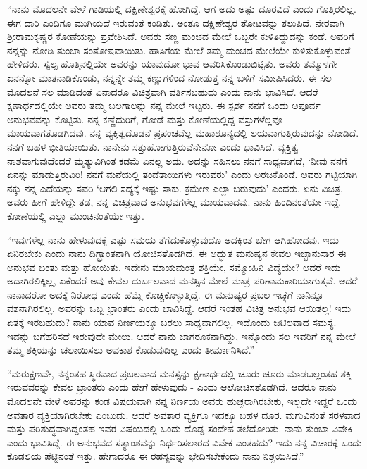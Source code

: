 “ನಾನು ಮೊದಲನೇ ವೇಳೆ ಗಾಡಿಯಲ್ಲಿ ದಕ್ಷಿಣೇಶ್ವರಕ್ಕೆ ಹೋಗಿದ್ದೆ. ಆಗ ಅದು ಅಷ್ಟು ದೂರವಿದೆ ಎಂದು ಗೊತ್ತಿರಲಿಲ್ಲ. ಈಗ ದಾರಿ ಎಂದಿಗೂ ಮುಗಿಯದೆ ಇರುವಂತೆ ಕಂಡಿತು. ಅಂತೂ ದಕ್ಷಿಣೇಶ್ವರ ತೋಟವನ್ನು ತಲುಪಿದೆ. ನೇರವಾಗಿ ಶ‍್ರೀರಾಮಕೃಷ್ಣರ ಕೋಣೆಯನ್ನು ಪ್ರವೇಶಿಸಿದೆ. ಅವರು ಸಣ್ಣ ಮಂಚದ ಮೇಲೆ ಒಬ್ಬರೇ ಕುಳಿತಿದ್ದುದನ್ನು ಕಂಡೆ. ಅವರಿಗೆ ನನ್ನನ್ನು ನೋಡಿ ತುಂಬಾ ಸಂತೋಷವಾಯಿತು. ಹಾಸಿಗೆಯ ಮೇಲೆ ತಮ್ಮ ಮಂಚದ ಮೇಲೆಯೇ ಕುಳಿತುಕೊಳ್ಳುವಂತೆ ಹೇಳಿದರು. ಸ್ವಲ್ಪ ಹೊತ್ತಿನಲ್ಲಿಯೇ ಅವರನ್ನು ಯಾವುದೋ ಭಾವ ಆವರಿಸಿಕೊಂಡುಬಿಟ್ಟಿತು. ಅವರು ತಮ್ಮೊಳಗೇ ಏನನ್ನೋ ಮಾತನಾಡಿಕೊಂಡು, ನನ್ನನ್ನೇ ತಮ್ಮ ಕಣ್ಣುಗಳಿಂದ ನೋಡುತ್ತ ನನ್ನ ಬಳಿಗೆ ಸಮೀಪಿಸಿದರು. ಈ ಸಲ ಮೊದಲನೆ ಸಲ ಮಾಡಿದಂತೆ ಏನಾದರೂ ವಿಚಿತ್ರವಾಗಿ ವರ್ತಿಸಬಹುದು ಎಂದು ನಾನು ಭಾವಿಸಿದೆ. ಆದರೆ ಕ್ಷಣಾರ್ಧದಲ್ಲಿಯೇ ಅವರು ತಮ್ಮ ಬಲಗಾಲನ್ನು ನನ್ನ ಮೇಲೆ ಇಟ್ಟರು. ಈ ಸ್ಪರ್ಶ ನನಗೆ ಒಂದು ಅಪೂರ್ವ ಅನುಭವವನ್ನು ಕೊಟ್ಟಿತು. ನನ್ನ ಕಣ್ಣೆದುರಿಗೆ, ಗೋಡೆ ಮತ್ತು ಕೋಣೆಯಲ್ಲಿದ್ದ ವಸ್ತುಗಳೆಲ್ಲವೂ ಮಾಯವಾಗತೊಡಗಿದವು. ನನ್ನ ವ್ಯಕ್ತಿತ್ವದೊಡನೆ ಪ್ರಪಂಚವೆಲ್ಲ ಮಹಾಶೂನ್ಯದಲ್ಲಿ ಲಯವಾಗುತ್ತಿರುವುದನ್ನು ನೋಡಿದೆ. ನನಗೆ ಬಹಳ ಭೀತಿಯಾಯಿತು. ನಾನೇನು ಸತ್ತುಹೋಗುತ್ತಿರುವೆನೇನೋ ಎಂದು ಭಾವಿಸಿದೆ. ವ್ಯಕ್ತಿತ್ವ ನಾಶವಾಗುವುದೆಂದರೆ ಮೃತ್ಯುವಿಗಿಂತ ಕಡಮೆ ಏನಲ್ಲ ಅದು. ಅದನ್ನು ಸಹಿಸಲು ನನಗೆ ಸಾಧ್ಯವಾಗದೆ, ‘ನೀವು ನನಗೆ ಏನನ್ನು ಮಾಡುತ್ತಿರುವಿರಿ! ನನಗೆ ಮನೆಯಲ್ಲಿ ತಂದೆತಾಯಿಗಳು ಇರುವರು’ ಎಂದು ಅರಚಿಕೊಂಡೆ. ಅವರು ಗಟ್ಟಿಯಾಗಿ ನಕ್ಕು ನನ್ನ ಎದೆಯನ್ನು ಸವರಿ ‘ಆಗಲಿ ಸದ್ಯಕ್ಕೆ ಇಷ್ಟು ಸಾಕು. ಕ್ರಮೇಣ ಎಲ್ಲಾ ಬರುವುದು’ ಎಂದರು. ಏನು ವಿಚಿತ್ರ, ಅವರು ಹೀಗೆ ಹೇಳಿದ್ದೇ ತಡ, ನನ್ನ ವಿಚಿತ್ರವಾದ ಅನುಭವಗಳೆಲ್ಲ ಮಾಯವಾದವು. ನಾನು ಹಿಂದಿನಂತೆಯೇ ಇದ್ದೆ. ಕೋಣೆಯಲ್ಲಿ ಎಲ್ಲಾ ಮುಂಚಿನಂತೆಯೇ ಇತ್ತು.

“ಇವುಗಳೆಲ್ಲ ನಾನು ಹೇಳುವುದಕ್ಕೆ ಎಷ್ಟು ಸಮಯ ತೆಗೆದುಕೊಳ್ಳುವುದೊ ಅದಕ್ಕಿಂತ ಬೇಗ ಆಗಿಹೋದವು. ಇದು ಏನಿರಬೇಕು ಎಂದು ನಾನು ದಿಗ್ಭ್ರಾಂತನಾಗಿ ಯೋಚಿಸತೊಡಗಿದೆ. ಈ ಅದ್ಭುತ ಮನುಷ್ಯನ ಕೇವಲ ಇಚ್ಛಾನುಸಾರ ಈ ಅನುಭವ ಬಂತು ಮತ್ತು ಹೋಯಿತು. ಇದೇನು ಮಾಯಮಂತ್ರ ಶಕ್ತಿಯೇ, ಸಮ್ಮೋಹಿನಿ ವಿದ್ಯೆಯೇ? ಆದರೆ ಇದು ಅದಾಗಿರಲಿಕ್ಕಿಲ್ಲ, ಏಕೆಂದರೆ ಅವು ಕೇವಲ ದುರ್ಬಲವಾದ ಮನಸ್ಸಿನ ಮೇಲೆ ಮಾತ್ರ ಪರಿಣಾಮಕಾರಿಯಾಗುತ್ತವೆ. ಆದರೆ ನಾನಾದರೋ ಅದಕ್ಕೆ ನಿರೋಧ ಎಂದು ಹೆಮ್ಮೆ ಕೊಚ್ಚಿಕೊಳ್ಳುತ್ತಿದ್ದೆ. ಈ ಮನುಷ್ಯರ ಪ್ರಬಲ ಇಚ್ಛೆಗೆ ನಾನಿನ್ನೂ ವಶನಾಗಿರಲಿಲ್ಲ. ಅವರನ್ನು ಒಬ್ಬ ಭ್ರಾಂತರು ಎಂದು ಭಾವಿಸಿದ್ದೆ. ಆದರೆ ಇಂತಹ ವಿಚಿತ್ರ ಅನುಭವ ಆಯಿತಲ್ಲ! ಇದು ಏತಕ್ಕೆ ಇರಬಹುದು? ನಾನು ಯಾವ ನಿರ್ಣಯಕ್ಕೂ ಬರಲು ಸಾಧ್ಯವಾಗಲಿಲ್ಲ. ಇದೊಂದು ಜಟಿಲವಾದ ಸಮಸ್ಯೆ. ಇದನ್ನು ಬಗೆಹರಿಸದೆ ಇರುವುದೇ ಮೇಲು. ಆದರೆ ನಾನು ಜಾಗರೂಕನಾಗಿದ್ದು, ಇನ್ನೊಂದು ಸಲ ಇವರಿಗೆ ನನ್ನ ಮೇಲೆ ತಮ್ಮ ಶಕ್ತಿಯನ್ನು ಚಲಾಯಿಸಲು ಅವಕಾಶ ಕೊಡುವುದಿಲ್ಲ ಎಂದು ತೀರ್ಮಾನಿಸಿದೆ.”

“ಮರುಕ್ಷಣವೇ, ನನ್ನಂತಹ ಸ್ಥಿರವಾದ ಪ್ರಬಲವಾದ ಮನಸ್ಸನ್ನು ಕ್ಷಣಾರ್ಧದಲ್ಲಿ ಚೂರು ಚೂರು ಮಾಡಬಲ್ಲಂತಹ ಶಕ್ತಿ ಇರುವವರನ್ನು ಕೇವಲ ಭ್ರಾಂತರು ಎಂದು ಹೇಗೆ ಹೇಳುವುದು - ಎಂದು ಆಲೋಚಿಸತೊಡಗಿದೆ. ಆದರೂ ನಾನು ಮೊದಲನೇ ವೇಳೆ ಅವರನ್ನು ಕಂಡ ವಿಷಯವಾಗಿ ನನ್ನ ನಿರ್ಣಯ ಅವರು ಹುಚ್ಚರಾಗಿರಬೇಕು, ಇಲ್ಲದೇ ಇದ್ದರೆ ಒಂದು ಅವತಾರ ವ್ಯಕ್ತಿಯಾಗಿರಬೇಕು ಎಂಬುದು. ಆದರೆ ಅವತಾರ ವ್ಯಕ್ತಿಗೂ ಇದಕ್ಕೂ ಬಹಳ ದೂರ. ಮಗುವಿನಂತೆ ಸರಳವಾದ ಮತ್ತು ಪರಿಶುದ್ಧವಾಗಿದ್ದಂತಹ ಇವರ ವಿಷಯದಲ್ಲಿ ಒಂದು ದೊಡ್ಡ ಸಂದೇಹ ತಲೆದೋರಿತು. ನಾನು ತುಂಬಾ ವಿವೇಕಿ ಎಂದು ಭಾವಿಸಿದ್ದೆ. ಈ ಅನುಭವದ ಸತ್ಯಾಂಶವನ್ನು ನಿರ್ಧರಿಸಲಾರದ ವಿವೇಕ ಎಂತಹದು? ಇದು ನನ್ನ ವಿಚಾರಕ್ಕೆ ಒಂದು ಕೊಡಲಿಯ ಪೆಟ್ಟಿನಂತೆ ಇತ್ತು. ಹೇಗಾದರೂ ಈ ರಹಸ್ಯವನ್ನು ಭೇದಿಸಬೇಕೆಂದು ನಾನು ನಿಶ್ಚಯಿಸಿದೆ.”

